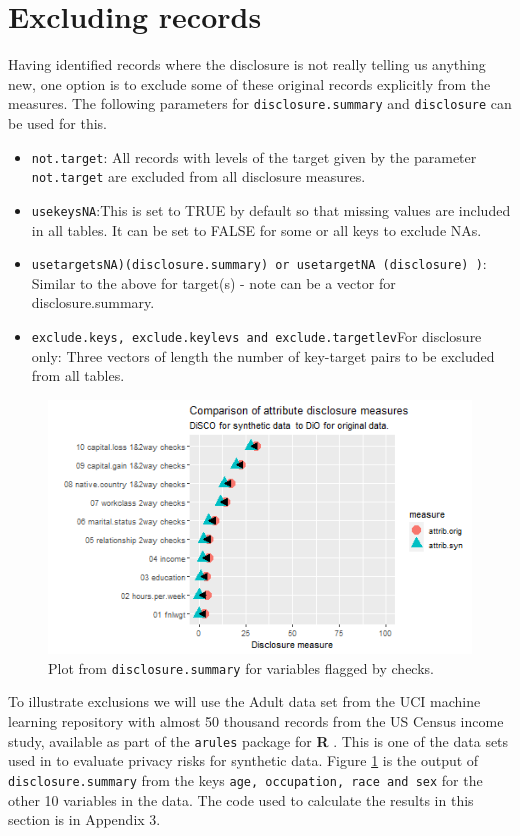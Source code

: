 \documentclass[12pt]{article}
\begin{document}
\section{Excluding records}\label{sec:exclusions}
Having identified records where the disclosure is not really telling us anything new, one option is to exclude some of these original records explicitly from the measures. The following parameters 
for \texttt{disclosure.summary} and \texttt{disclosure} can be used for this.
\begin{itemize}
\item{\texttt{not.target}: All records with levels of the target given by the parameter \texttt{not.target} are excluded from all disclosure measures.}
\item{\texttt{usekeysNA}:This is set to TRUE by default so that missing values are included in all tables. It can be set to FALSE for some or all keys to exclude NAs.}
\item{\texttt{usetargetsNA)(disclosure.summary) or usetargetNA (disclosure) )}: Similar to the above for target(s) - note can be a vector for disclosure.summary.}
\item{\texttt{exclude.keys, exclude.keylevs and exclude.targetlev}For disclosure only: Three vectors of length the number of key-target pairs to be excluded from all tables.}
\end{itemize}
\begin{figure}[ht]
\centering
\includegraphics[width=1\linewidth]{fig2dis.png}
\caption{Plot from \texttt{disclosure.summary} for variables flagged by checks.}
\label{fig:f2}
\end{figure}
To illustrate exclusions we will use the Adult data set from the UCI machine learning repository \cite{UCI} with almost 50 thousand records from the US Census income study, available as part of the \texttt{arules} package for \textbf{R} \cite{arules}. This is one of the data sets used in \cite{giomi2022anon} to evaluate privacy risks for synthetic data. Figure \ref{fig:f2} is the output of \texttt{disclosure.summary} from the keys \texttt{age, occupation, race and sex} for the other 10 variables in the data. The code used to calculate the results in this section is in Appendix 3.
\end{document}
